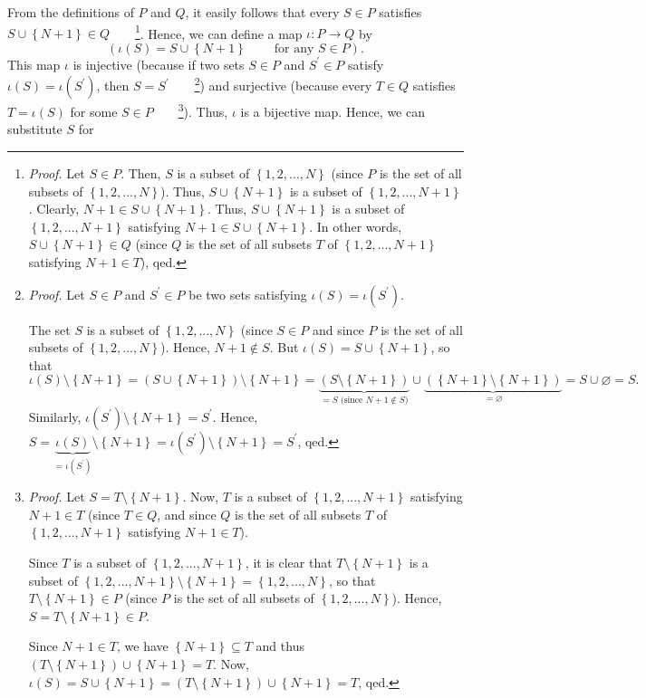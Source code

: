 \documentclass[numbers=enddot,12pt,final,onecolumn,notitlepage]{scrartcl}%
\begin{document}
From the definitions of $P$ and $Q$, it easily follows that every $S\in P$
satisfies $S\cup\left\{  N+1\right\}  \in Q$\ \ \ \ \footnote{\textit{Proof.}
Let $S\in P$. Then, $S$ is a subset of $\left\{  1,2,...,N\right\}  $ (since
$P$ is the set of all subsets of $\left\{  1,2,...,N\right\}  $). Thus,
$S\cup\left\{  N+1\right\}  $ is a subset of $\left\{  1,2,...,N+1\right\}  $.
Clearly, $N+1\in S\cup\left\{  N+1\right\}  $. Thus, $S\cup\left\{
N+1\right\}  $ is a subset of $\left\{  1,2,...,N+1\right\}  $ satisfying
$N+1\in S\cup\left\{  N+1\right\}  $. In other words, $S\cup\left\{
N+1\right\}  \in Q$ (since $Q$ is the set of all subsets $T$ of $\left\{
1,2,...,N+1\right\}  $ satisfying $N+1\in T$), qed.}. Hence, we can define a
map $\iota:P\rightarrow Q$ by%
\[
\left(  \iota\left(  S\right)  =S\cup\left\{  N+1\right\}
\ \ \ \ \ \ \ \ \ \ \text{for any }S\in P\right)  .
\]
This map $\iota$ is injective (because if two sets $S\in P$ and $S^{\prime}\in
P$ satisfy $\iota\left(  S\right)  =\iota\left(  S^{\prime}\right)  $, then
$S=S^{\prime}$\ \ \ \ \footnote{\textit{Proof.} Let $S\in P$ and $S^{\prime
}\in P$ be two sets satisfying $\iota\left(  S\right)  =\iota\left(
S^{\prime}\right)  $.
\par
The set $S$ is a subset of $\left\{  1,2,...,N\right\}  $ (since $S\in P$ and
since $P$ is the set of all subsets of $\left\{  1,2,...,N\right\}  $). Hence,
$N+1\notin S$. But $\iota\left(  S\right)  =S\cup\left\{  N+1\right\}  $, so
that%
\[
\iota\left(  S\right)  \setminus\left\{  N+1\right\}  =\left(  S\cup\left\{
N+1\right\}  \right)  \setminus\left\{  N+1\right\}  =\underbrace{\left(
S\setminus\left\{  N+1\right\}  \right)  }_{=S\text{ (since }N+1\notin
S\text{)}}\cup\underbrace{\left(  \left\{  N+1\right\}  \setminus\left\{
N+1\right\}  \right)  }_{=\varnothing}=S\cup\varnothing=S.
\]
Similarly, $\iota\left(  S^{\prime}\right)  \setminus\left\{  N+1\right\}
=S^{\prime}$. Hence, $S=\underbrace{\iota\left(  S\right)  }_{=\iota\left(
S^{\prime}\right)  }\setminus\left\{  N+1\right\}  =\iota\left(  S^{\prime
}\right)  \setminus\left\{  N+1\right\}  =S^{\prime}$, qed.}) and surjective
(because every $T\in Q$ satisfies $T=\iota\left(  S\right)  $ for some $S\in
P$\ \ \ \ \footnote{\textit{Proof.} Let $S=T\setminus\left\{  N+1\right\}  $.
Now, $T$ is a subset of $\left\{  1,2,...,N+1\right\}  $ satisfying $N+1\in T$
(since $T\in Q$, and since $Q$ is the set of all subsets $T$ of $\left\{
1,2,...,N+1\right\}  $ satisfying $N+1\in T$).
\par
Since $T$ is a subset of $\left\{  1,2,...,N+1\right\}  $, it is clear that
$T\setminus\left\{  N+1\right\}  $ is a subset of $\left\{
1,2,...,N+1\right\}  \setminus\left\{  N+1\right\}  =\left\{
1,2,...,N\right\}  $, so that $T\setminus\left\{  N+1\right\}  \in P$ (since
$P$ is the set of all subsets of $\left\{  1,2,...,N\right\}  $). Hence,
$S=T\setminus\left\{  N+1\right\}  \in P$.
\par
Since $N+1\in T$, we have $\left\{  N+1\right\}  \subseteq T$ and thus
$\left(  T\setminus\left\{  N+1\right\}  \right)  \cup\left\{  N+1\right\}
=T$. Now, $\iota\left(  S\right)  =S\cup\left\{  N+1\right\}  =\left(
T\setminus\left\{  N+1\right\}  \right)  \cup\left\{  N+1\right\}  =T$,
qed.}). Thus, $\iota$ is a bijective map. Hence, we can substitute $S$ for
\end{document}
